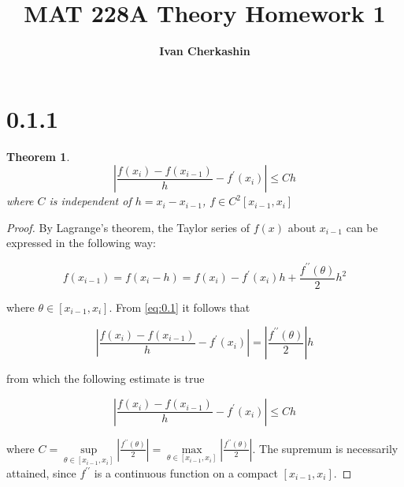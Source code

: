 \documentclass[a4paper]{amsproc}
\title[MAT 228A Theory Homework 1]{MAT 228A Theory Homework 1}
\author[Cherkashin]{\bfseries Ivan Cherkashin}
\theoremstyle{plain}
\newtheorem*{thm}{Theorem}
\theoremstyle{definition}
\theoremstyle{remark}
\numberwithin{equation}{section}
\renewcommand{\le}{\leqslant}\renewcommand{\leq}{\leqslant}
\begin{document}
\vspace{18mm} \setcounter{page}{1} \thispagestyle{empty}



\maketitle

\section*{0.1.1}

\begin{thm} \label{} %
\begin{equation}\label{eq:0.1}
\left\lvert \frac{f(x_i)-f(x_{i-1})}{h}-f^{\prime}(x_i) \right\rvert \le Ch 
\end{equation}
where $C$ is independent of $h=x_i-x_{i-1}$, $f \in C^2[x_{i-1}, x_i]$ 
\end{thm}

\begin{proof}
By Lagrange's theorem, the Taylor series of $f(x)$ about $x_{i-1}$ can be expressed in the following way:

\begin{equation}\label{eq:0.2}
f(x_{i-1}) = f(x_i - h) = f(x_i)-f^{\prime}(x_i)h+\frac{f^{\prime \prime}(\theta)}{2}h^2
\end{equation}

where $\theta \in [x_{i-1}, x_i]$. From \eqref{eq:0.1} it follows that

\begin{equation}\label{eq:0.3}
\left\lvert \frac{f(x_i)-f(x_{i-1})}{h}-f^{\prime}(x_i) \right\rvert = \left\lvert \frac{f^{\prime \prime}(\theta)}{2} \right\rvert h
\end{equation}

from which the following estimate is true

\begin{equation}\label{eq:0.4}
\left\lvert \frac{f(x_i)-f(x_{i-1})}{h}-f^{\prime}(x_i) \right\rvert \le Ch
\end{equation}
 
where $ C = \underset{\theta \in [x_{i-1}, x_i]}{\sup} \left\lvert \frac{f^{\prime \prime}(\theta)}{2} \right\rvert = \underset{\theta \in [x_{i-1}, x_i]}{\max} \left\lvert \frac{f^{\prime \prime}(\theta)}{2} \right\rvert $.
The supremum is necessarily attained, since $f^{\prime \prime}$ is a continuous function on a compact $[x_{i-1}, x_i]$.

\end{proof}
\end{document}
